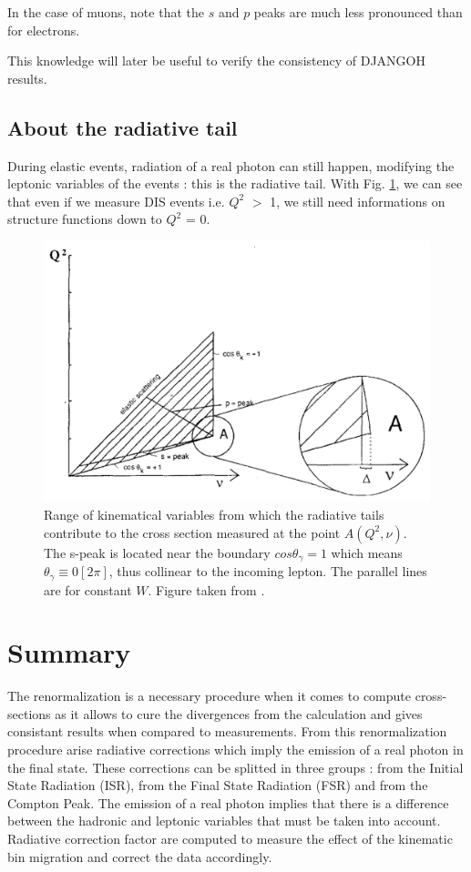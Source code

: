 In the case of muons, note that the $s$ and $p$ peaks are much less pronounced than for electrons.

This knowledge will later be useful to verify the consistency of DJANGOH results.

\subsection{About the radiative tail}

During elastic events, radiation of a real photon can still happen, modifying the leptonic variables of the events : this is the radiative tail. With Fig. \ref{fig:peaks}, we can see that even if we measure DIS events i.e. $Q^2$ $>$ 1, we still need informations on structure functions down to $Q^2$ = 0.

\begin{figure}[h!]
\centering
\includegraphics[width=12cm]{gfx/peaks.png}
\caption{Range of kinematical variables from which the radiative tails contribute to the cross section
measured at the point $A(Q^2, \nu)$. The s-peak is located near the boundary $cos\theta_\gamma=1$ which means
$\theta_\gamma \equiv 0[2\pi]$, thus collinear to the incoming lepton. The parallel lines are for constant $W$. Figure taken from \cite{TERAD2}.}
\label{fig:peaks}
\end{figure}

\newpage


\section{Summary}

The renormalization is a necessary procedure when it comes to compute cross-sections as it allows to cure the divergences from the calculation and gives consistant results when compared to measurements. From this renormalization procedure arise radiative corrections which imply the emission of a real photon in the final state. These corrections can be splitted in three groups : from the Initial State Radiation (ISR), from the Final State Radiation (FSR) and from the Compton Peak. The emission of a real photon implies that there is a difference between the hadronic and leptonic variables that must be taken into account. Radiative correction factor are computed to measure the effect of the kinematic bin migration and correct the data accordingly.
